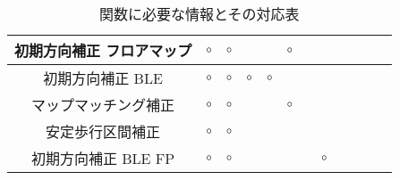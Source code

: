 \documentclass[Japanese]{abstruct}
\begin{document}
\begin{table*}[b]
{\begin{tabular}{|c|c|c|c|c|c|c|c|c|c|c|c|}
			初期方向補正 フロアマップ & \multicolumn{1}{c|}{$\circ$} & \multicolumn{1}{c|}{$\circ$} &                              &                              & \multicolumn{1}{c|}{$\circ$}                                                                                  &         &                              &                              &    &                              &    \\ \hline
			初期方向補正 BLE    & \multicolumn{1}{c|}{$\circ$} & \multicolumn{1}{c|}{$\circ$} & \multicolumn{1}{c|}{$\circ$} & \multicolumn{1}{c|}{$\circ$} &                                                                                                               &         &                              &                              &    &                              &    \\ \hline
			マップマッチング補正    & \multicolumn{1}{c|}{$\circ$} & \multicolumn{1}{c|}{$\circ$} &                              &                              & \multicolumn{1}{c|}{$\circ$}                                                                                  &         &                              &                              &    &                              &    \\ \hline
			安定歩行区間補正      & \multicolumn{1}{c|}{$\circ$} & \multicolumn{1}{c|}{$\circ$} &                              &                              &                                                                                                               &         &                              &                              &    &                              &    \\ \hline
			初期方向補正 BLE FP & \multicolumn{1}{c|}{$\circ$} & \multicolumn{1}{c|}{$\circ$} &                              &                              &                                                                                                               &         & \multicolumn{1}{c|}{$\circ$} &                              &    &                              &    \\ \hline
		\end{tabular}
	}
	\caption{関数に必要な情報とその対応表} \label{}
\end{table*}
\end{document}
